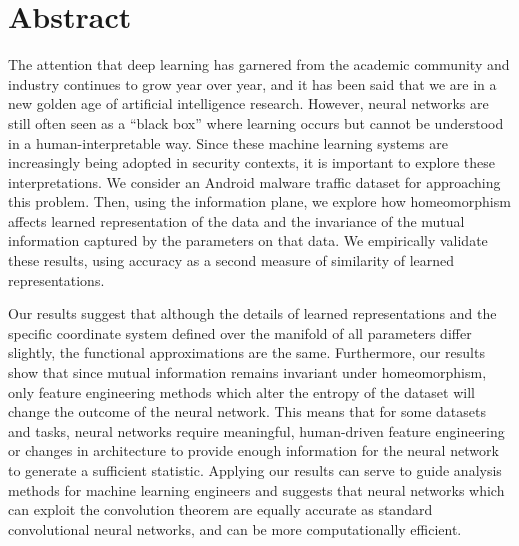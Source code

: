 \chapter*{Abstract}
%
The attention that deep learning has garnered from the academic community and industry continues to grow year over year, and it has been said that we are in a new golden age of artificial intelligence research.
However, neural networks are still often seen as a ``black box'' where learning occurs but cannot be understood in a human-interpretable way.
Since these machine learning systems are increasingly being adopted in security contexts, it is important to explore these interpretations.
We consider an Android malware traffic dataset for approaching this problem.
Then, using the information plane, we explore how homeomorphism affects learned representation of the data and the invariance of the mutual information captured by the parameters on that data.
We empirically validate these results, using accuracy as a second measure of similarity of learned representations.

Our results suggest that although the details of learned representations and the specific coordinate system defined over the manifold of all parameters differ slightly, the functional approximations are the same.
Furthermore, our results show that since mutual information remains invariant under homeomorphism, only feature engineering methods which alter the entropy of the dataset will change the outcome of the neural network.
This means that for some datasets and tasks, neural networks require meaningful, human-driven feature engineering or changes in architecture to provide enough information for the neural network to generate a sufficient statistic.
Applying our results can serve to guide analysis methods for machine learning engineers and suggests that neural networks which can exploit the convolution theorem are equally accurate as standard convolutional neural networks, and can be more computationally efficient.
%
